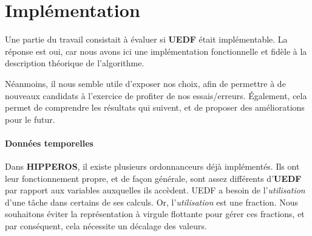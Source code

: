 \chapter{Implémentation}

	Une partie du travail consistait à évaluer si \textbf{UEDF} était implémentable. 
	La réponse est oui, car nous avons ici une implémentation fonctionnelle et fidèle à la description 
	théorique de l'algorithme. \newline
	
	Néanmoins, il nous semble utile d'exposer nos choix, afin de permettre à de nouveaux candidats 
	à l'exercice de profiter de nos essais/erreurs. Également, cela permet de comprendre les 
	résultats qui suivent, et de proposer des améliorations pour le futur.

	\subsubsection{Données temporelles}
	
		Dans \textbf{HIPPEROS}, il existe plusieurs ordonnanceurs déjà implémentés. 
		Ils ont leur fonctionnement propre, et de façon générale, sont assez différents d'\textbf{UEDF} par 
		rapport aux variables auxquelles ils accèdent. 
		UEDF a besoin de l'\textit{utilisation} d'une tâche dans certains de ses calculs. Or, l'\textit{utilisation} 
		est une fraction. Nous souhaitons éviter la représentation à virgule flottante 
		pour gérer ces fractions, et par conséquent, cela nécessite un décalage des valeurs.\newline
		 

